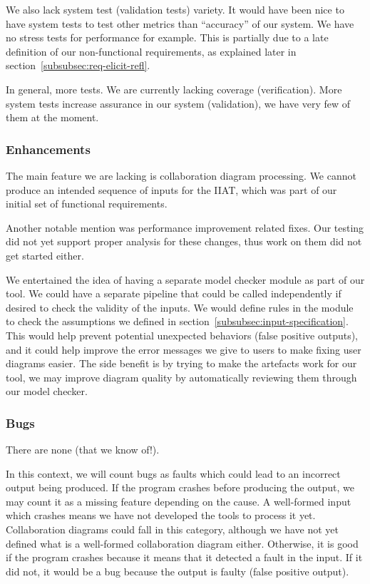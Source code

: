 We also lack system test (validation tests) variety.
It would have been nice to have system tests to test other metrics than ``accuracy'' of our system.
We have no stress tests for performance for example.
This is partially due to a late definition of our non-functional requirements,
as explained later in section~\ref{subsubsec:req-elicit-refl}.

In general, more tests.
We are currently lacking coverage (verification).
More system tests increase assurance in our system (validation), we have very few of them at the moment.

\subsubsection{Enhancements}
The main feature we are lacking is collaboration diagram processing.
We cannot produce an intended sequence of inputs for the IIAT, which was part of our initial set of functional requirements.

Another notable mention was performance improvement related fixes.
Our testing did not yet support proper analysis for these changes, thus work on them did not get started either.

We entertained the idea of having a separate model checker module as part of our tool.
We could have a separate pipeline that could be called independently if desired to check the validity of the inputs.
We would define rules in the module to check the assumptions we defined in section~\ref{subsubsec:input-specification}.
This would help prevent potential unexpected behaviors (false positive outputs),
and it could help improve the error messages we give to users to make fixing user diagrams easier.
The side benefit is by trying to make the artefacts work for our tool,
we may improve diagram quality by automatically reviewing them through our model checker.


\subsubsection{Bugs}
There are none (that we know of!).

In this context, we will count bugs as faults which could lead to an incorrect output being produced.
If the program crashes before producing the output, we may count it as a missing feature depending on the cause.
A well-formed input which crashes means we have not developed the tools to process it yet.
Collaboration diagrams could fall in this category, although we have not yet defined what is a well-formed collaboration diagram either.
Otherwise, it is good if the program crashes because it means that it detected a fault in the input.
If it did not, it would be a bug because the output is faulty (false positive output).

